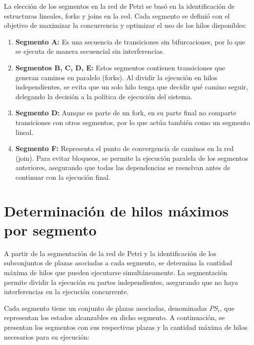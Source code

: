 \documentclass[12pt]{article}
\begin{document}
La elección de los segmentos en la red de Petri se basó en la identificación de estructuras lineales, forks y joins en la red. Cada segmento se definió con el objetivo de maximizar la concurrencia y optimizar el uso de los hilos disponibles:

\begin{enumerate}
    \item \textbf{Segmento A:} Es una secuencia de transiciones sin bifurcaciones, por lo que se ejecuta de manera secuencial sin interferencias.
    
    \item \textbf{Segmentos B, C, D, E:} Estos segmentos contienen transiciones que generan caminos en paralelo (forks). Al dividir la ejecución en hilos independientes, se evita que un solo hilo tenga que decidir qué camino seguir, delegando la decisión a la política de ejecución del sistema.
    
    \item \textbf{Segmento D:} Aunque es parte de un fork, en su parte final no comparte transiciones con otros segmentos, por lo que actúa también como un segmento lineal.
    
    \item \textbf{Segmento F:} Representa el punto de convergencia de caminos en la red (join). Para evitar bloqueos, se permite la ejecución paralela de los segmentos anteriores, asegurando que todas las dependencias se resuelvan antes de continuar con la ejecución final.
\end{enumerate}
\newpage
\section{Determinación de hilos máximos por segmento}

A partir de la segmentación de la red de Petri y la identificación de los subconjuntos de plazas asociadas a cada segmento, se determina la cantidad máxima de hilos que pueden ejecutarse simultáneamente. La segmentación permite dividir la ejecución en partes independientes, asegurando que no haya interferencias en la ejecución concurrente.

Cada segmento tiene un conjunto de plazas asociadas, denominadas \(PS_i\), que representan los estados alcanzables en dicho segmento. A continuación, se presentan los segmentos con sus respectivas plazas y la cantidad máxima de hilos necesarios para su ejecución:
\end{document}
